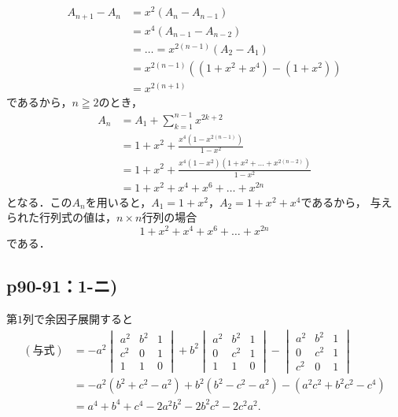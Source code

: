 \documentclass[uplatex,dvipdfmx,a4paper,11pt,fleqn]{jsarticle}
\begin{document}
\begin{tleftbar}
    \begin{align*} 
        A_{n+1}-A_{n} & = x^2 (A_n-A_{n-1}) \\
        & = x^4 (A_{n-1} - A_{n-2}) \\
        & = \dots = x^{2(n-1)}(A_2-A_1)\\
        & = x^{2(n-1)} ((1+x^2 + x^4) -(1+x^2)) \\
        & = x^{2(n+1)}
    \end{align*} 
    であるから，$n \geqq 2$のとき，
    \begin{align*} 
        A_n & = A_1 +\sum_{k=1}^{n-1} x^{2k+2} \\
        & = 1+x^2 + \frac{x^4(1-x^{2(n-1)})}{1-x^2} \\
        & = 1+x^2 + \frac{x^4 (1-x^2)(1+x^2 + \dots + x^{2(n-2)})}{1-x^2} \\
        & = 1+x^2 + x^4 + x^6 + \dots + x^{2n} 
    \end{align*}
    となる．この$ A_n$を用いると，$ A_1 = 1+x^2 $，$ A_2 = 1+x^2+x^4$であるから，
    与えられた行列式の値は，$n \times n$行列の場合
    \[
        1+x^2 + x^4 + x^6 + \dots + x^{2n} 
    \]
    である．
    \end{tleftbar}

    \newpage 

\subsection*{p90-91：1-ニ)}

\begin{tleftbar}
    第$1$列で余因子展開すると
    \begin{align*} 
        (\text{与式})& = -a^2\begin{vmatrix} a^2 & b^2 & 1 \\ c^2 & 0 & 1 \\ 1 & 1 & 0 \end{vmatrix}+b^2 \begin{vmatrix} a^2 & b^2 & 1 \\ 0 & c^2 & 1 \\ 1 & 1 & 0 \end{vmatrix} - \begin{vmatrix} a^2 & b^2 & 1 \\ 0 & c^2 & 1 \\ c^2 & 0 & 1 \end{vmatrix} \\
        & = -a^2 (b^2+c^2 -a^2) +b^2 (b^2-c^2-a^2)- (a^2c^2+b^2c^2-c^4) \\
        & =a^4+b^4+c^4 -2a^2b^2 - 2b^2 c^2 -2c^2 a^2 .
    \end{align*}
\end{tleftbar}
\newpage 
\end{document}
